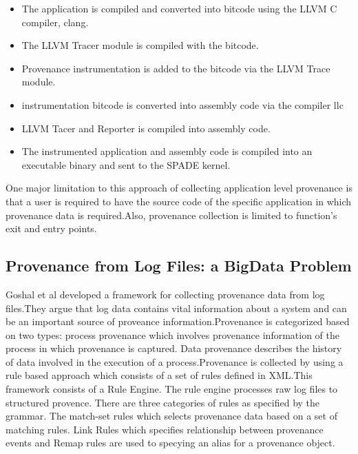 \begin{itemize}
\item The application is compiled and converted into bitcode using the LLVM C compiler, clang.

\item The LLVM Tracer module is compiled with the bitcode.

\item Provenance instrumentation is added to the bitcode via the LLVM Trace module.

\item instrumentation bitcode is converted into assembly code via the compiler llc

\item LLVM Tacer and Reporter is compiled into assembly code.

\item  The instrumented application and assembly code is compiled into an executable binary and sent to the SPADE kernel.
\end{itemize}

One major limitation to this approach of collecting application level provenance is that a user is required to have the source code of the specific application in which provenance data is required.Also, provenance collection is limited to function's exit and entry points.


\subsection{Provenance from Log Files: a BigData Problem}


Goshal et al developed a framework for collecting provenance data from log files.They argue that log data contains vital information about a system and can be an important source of proveance information.Provenance is categorized based on two types: process provenance which involves provenance information of the process in which provenance is captured. Data provenance describes the history of data involved in the execution of a process.Provenance is collected by using a rule based approach which consists of a set of rules defined in XML.This framework consists of a Rule Engine. The rule engine processes raw log files to structured provence. There are three categories of rules as specified by the grammar. The match-set rules which selects provenance data based on a set of matching rules. Link Rules which specifies relationship between provenance events and Remap rules are used to specying an alias for a provenance object.


